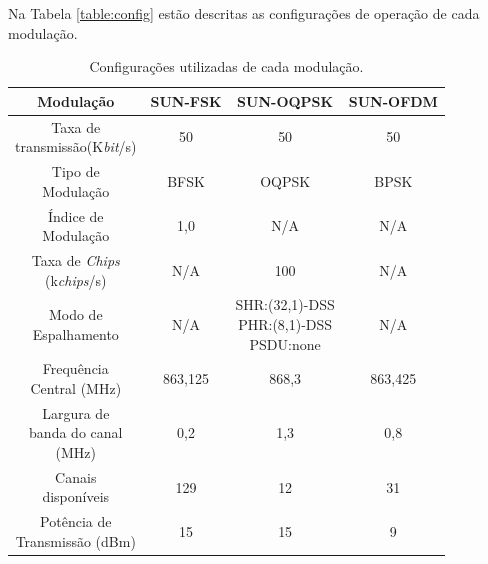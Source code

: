 Na Tabela \ref{table:config} estão descritas as configurações de operação de cada modulação.
\begin{table}[h!]
  \centering
  \caption{Configurações utilizadas de cada modulação.}
  \begin{tabular}{|c c c c|}
    \hline
    Modulação & SUN-FSK        & SUN-OQPSK         & SUN-OFDM \\ [0.5ex]
    \hline\hline
    \makecell{Taxa de                                         \\transmissão(K\emph{bit}/s)    } & 50      & 50                       & 50       \\\hline
    \makecell{Tipo de                                         \\Modulação                     } & BFSK    & OQPSK                    & BPSK     \\\hline
    \makecell{Índice de                                       \\Modulação                   } & 1,0     & N/A                      & N/A      \\\hline
    \makecell{Taxa de \emph{Chips}                            \\(k\emph{chips}/s) } &   N/A      & 100                      & N/A      \\\hline
    \makecell{Modo de                                         \\Espalhamento                  } & N/A     & \makecell{SHR:(32,1)-DSS            \\ PHR:(8,1)-DSS\\ PSDU:none} & N/A      \\\hline
    \makecell{Frequência                                      \\Central (MHz)              } & 863,125   & 868,3                      & 863,425    \\\hline
    \makecell{Largura de                                      \\banda do canal                                                               \\(MHz)        } & 0,2     & 1,3                     & 0,8      \\\hline
    \makecell{Canais                                          \\disponíveis                    } & 129     & 12                       & 31       \\\hline
    \makecell{Potência de                                     \\Transmissão (dBm)         } & 15      & 15                       & 9        \\\hline

\end{tabular}
\end{table}
